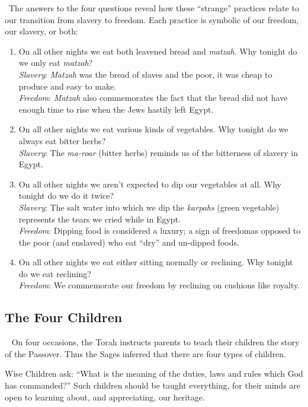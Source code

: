 \documentclass[12pt]{article}
\newcommand{\god}{God}
\newcommand{\newReading}{\faBook{}\ }
\begin{document}
\newReading The answers to the four questions reveal how these ``strange'' practices relate to our transition from slavery to freedom.  Each practice is symbolic of our freedom, our slavery, or both:
\begin{enumerate}
    \item On all other nights we eat both leavened bread and \textit{matzah}. Why tonight do we only eat \textit{matzah}? \\
    \textit{Slavery}: \textit{Matzah} was the bread of slaves and the poor, it was cheap to produce and easy to make. \\
    \textit{Freedom}: \textit{Matzah} also commemorates the fact that the bread did not have enough time to rise when the Jews hastily left Egypt.

    \item On all other nights we eat various kinds of vegetables. Why tonight do we always eat bitter herbs? \\
    \textit{Slavery}: The \textit{ma-roar} (bitter herbs) reminds us of the bitterness of slavery in Egypt.

    \item On all other nights we aren't expected to dip our vegetables at all.  Why tonight do we do it twice? \\
    \textit{Slavery}: The salt water into which we dip the \textit{karpahs} (green vegetable) represents the tears we cried while in Egypt. \\
    \textit{Freedom}: Dipping food is considered a luxury; a sign of freedom\textemdash{}as opposed to the poor (and enslaved) who eat ``dry'' and un-dipped foods.

    \item On all other nights we eat either sitting normally or reclining. Why tonight do we eat reclining? \\
    \textit{Freedom}: We commemorate our freedom by reclining on cushions like royalty.
\end{enumerate}

\subsection*{The Four Children}
\newReading
On four occasions, the Torah instructs parents to teach their children the story of the Passover. Thus the Sages inferred that there are four types of children.

Wise Children ask: ``What is the meaning of the duties, laws and rules which {\god} has commanded?'' Such children should be taught everything, for their minds are open to learning about, and appreciating, our heritage.
\end{document}
